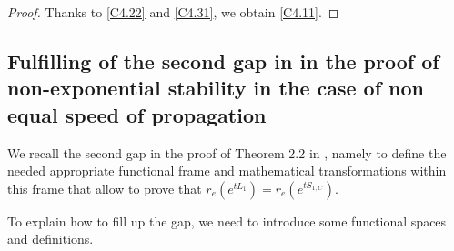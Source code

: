\documentclass[10pt, english]{article}
\begin{document}
{\begin{proof}
Thanks to \eqref{C4.22} and \eqref{C4.31}, we obtain \eqref{C4.11}.
\end{proof}

\subsection{Fulfilling of the second gap in \cite{SW2003} in the proof of non-exponential stability in the case of non equal speed of propagation}

We recall the second gap in the proof of Theorem 2.2 in \cite{SW2003}, namely to define the needed appropriate functional frame and mathematical transformations within this frame that allow to prove that $r_e(e^{tL_1})=r_e(e^{tS_{1,C}})$.

To explain how to fill up the gap, we need to introduce some functional spaces and definitions.

}
\end{document}
